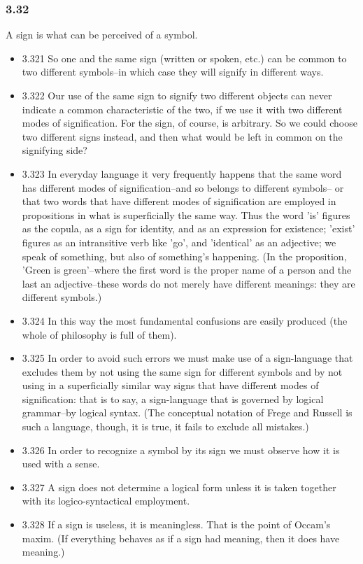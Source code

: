 \documentclass[11pt]{article}
\begin{document}
\subsubsection*{3.32}
\label{sec:orgdf4e9d3}
A sign is what can be perceived of a symbol.
\begin{itemize}
\item 3.321
\label{sec:org00fe6d4}
So one and the same sign (written or spoken, etc.) can be common to
two different symbols--in which case they will signify in different ways.
\item 3.322
\label{sec:org6de505f}
Our use of the same sign to signify two different objects can never
indicate a common characteristic of the two, if we use it with two
different modes of signification. For the sign, of course, is arbitrary. So
we could choose two different signs instead, and then what would be left in
common on the signifying side?
\item 3.323
\label{sec:org9de3bcf}
In everyday language it very frequently happens that the same word
has different modes of signification--and so belongs to different symbols--
or that two words that have different modes of signification are employed
in propositions in what is superficially the same way. Thus the word 'is'
figures as the copula, as a sign for identity, and as an expression for
existence; 'exist' figures as an intransitive verb like 'go', and
'identical' as an adjective; we speak of something, but also of something's
happening. (In the proposition, 'Green is green'--where the first word is
the proper name of a person and the last an adjective--these words do not
merely have different meanings: they are different symbols.)
\item 3.324
\label{sec:org399719b}
In this way the most fundamental confusions are easily produced (the
whole of philosophy is full of them).
\item 3.325
\label{sec:org51385ac}
In order to avoid such errors we must make use of a sign-language
that excludes them by not using the same sign for different symbols and by
not using in a superficially similar way signs that have different modes of
signification: that is to say, a sign-language that is governed by logical
grammar--by logical syntax. (The conceptual notation of Frege and Russell
is such a language, though, it is true, it fails to exclude all mistakes.)
\item 3.326
\label{sec:orgd47c915}
In order to recognize a symbol by its sign we must observe how it is
used with a sense.
\item 3.327
\label{sec:org4814124}
A sign does not determine a logical form unless it is taken together
with its logico-syntactical employment.
\item 3.328
\label{sec:org874ee0f}
If a sign is useless, it is meaningless. That is the point of Occam's
maxim. (If everything behaves as if a sign had meaning, then it does have
meaning.)
\end{itemize}
\end{document}
